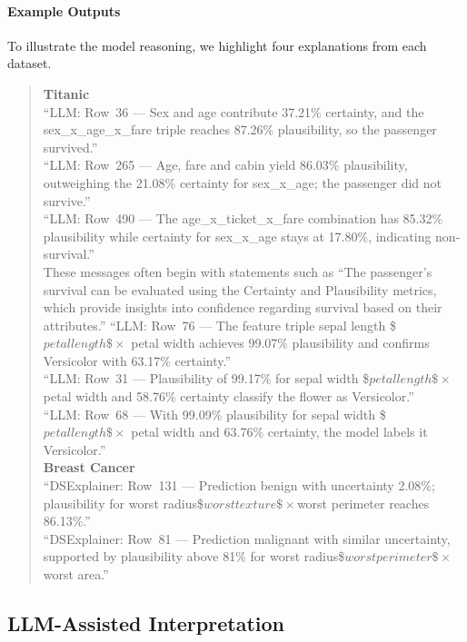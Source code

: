 \documentclass[acmlarge]{acmart}
\begin{document}
\paragraph{Example Outputs}
To illustrate the model reasoning, we highlight four explanations from each dataset.
\begin{quote}
\textbf{Titanic}\\

``LLM: Row~36 --- Sex and age contribute 37.21\% certainty, and the sex\_x\_age\_x\_fare triple reaches 87.26\% plausibility, so the passenger survived.''\\
``LLM: Row~265 --- Age, fare and cabin yield 86.03\% plausibility, outweighing the 21.08\% certainty for sex\_x\_age; the passenger did not survive.''\\
``LLM: Row~490 --- The age\_x\_ticket\_x\_fare combination has 85.32\% plausibility while certainty for sex\_x\_age stays at 17.80\%, indicating non-survival.''\\
These messages often begin with statements such as ``The passenger's survival can be evaluated using the Certainty and Plausibility metrics, which provide insights into confidence regarding survival based on their attributes.''
``LLM: Row~76 --- The feature triple sepal length \$\times$ petal length \$\times$ petal width achieves 99.07\% plausibility and confirms Versicolor with 63.17\% certainty.''\\
``LLM: Row~31 --- Plausibility of 99.17\% for sepal width \$\times$ petal length \$\times$ petal width and 58.76\% certainty classify the flower as Versicolor.''\\
``LLM: Row~68 --- With 99.09\% plausibility for sepal width \$\times$ petal length \$\times$ petal width and 63.76\% certainty, the model labels it Versicolor.''\\
\textbf{Breast Cancer}\\
``DSExplainer: Row~131 --- Prediction benign with uncertainty 2.08\%; plausibility for worst radius\$\times$worst texture\$\times$worst perimeter reaches 86.13\%.''\\
``DSExplainer: Row~81 --- Prediction malignant with similar uncertainty, supported by plausibility above 81\% for worst radius\$\times$worst perimeter\$\times$worst area.''\\
\end{quote}
\subsection{LLM-Assisted Interpretation}
\end{document}
